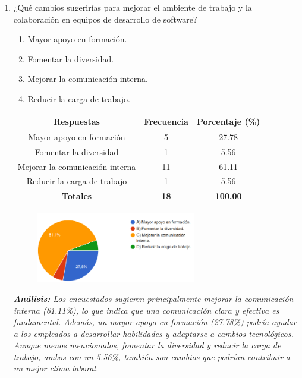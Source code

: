 \documentclass[journal]{IEEEtran}
\begin{document}
\begin{enumerate}
	\item ¿Qué cambios sugerirías para mejorar el ambiente de trabajo y la colaboración en equipos de desarrollo de software?
	\begin{enumerate}
		\item Mayor apoyo en formación.
		\item Fomentar la diversidad.
		\item Mejorar la comunicación interna.
		\item Reducir la carga de trabajo.
	\end{enumerate}
	\begin{table}[H]
		\renewcommand{\arraystretch}{1.3}
		\centering
		\begin{tabular}{|c|c|c|}
			\hline
			\textbf{Respuestas} & \textbf{Frecuencia} & \textbf{Porcentaje (\%)}\\
			\hline
			Mayor apoyo en formación & 5 & 27.78\\
			Fomentar la diversidad & 1 & 5.56\\
			Mejorar la comunicación interna & 11 & 61.11\\
			Reducir la carga de trabajo & 1 & 5.56\\
			\hline
			\textbf{Totales} &\textbf{18}& \textbf{100.00}\\
			\hline
		\end{tabular}
	\end{table}
	\begin{figure}[h]
		\centering
		\includegraphics[width=07cm]{Pregunta22}
	\end{figure}
	\textit{\textbf{Análisis:} Los encuestados sugieren principalmente mejorar la comunicación interna (61.11\%), lo que indica que una comunicación clara y efectiva es fundamental. Además, un mayor apoyo en formación (27.78\%) podría ayudar a los empleados a desarrollar habilidades y adaptarse a cambios tecnológicos. Aunque menos mencionados, fomentar la diversidad y reducir la carga de trabajo, ambos con un 5.56\%, también son cambios que podrían contribuir a un mejor clima laboral.}\\
	
\end{enumerate}
\end{document}

